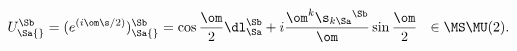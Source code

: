 \begin{equation}                                        \label{esutgr}
  U_\Sa{}^\Sb=(e^{(i\om\s/2)})_\Sa{}^\Sb
  =\cos\frac\om2\dl_\Sa^\Sb+i\frac{\om^k\s_{k\Sa}{}^\Sb}\om\sin\frac\om2
  ~~\in\MS\MU(2).
\end{equation}

